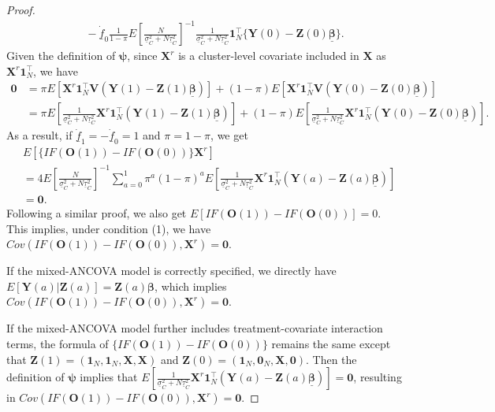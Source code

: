 \documentclass[12pt]{article}
\newcommand{\bX}{\boldsymbol{X}}
\newcommand{\bO}{\boldsymbol{O}}
\newcommand{\bZ}{\boldsymbol{Z}}
\newcommand{\bY}{\boldsymbol{Y}}
\newcommand{\bone}{\boldsymbol{1}}
\newcommand{\bzero}{\boldsymbol{0}}
\newcommand{\bbeta}{\boldsymbol{\beta}}
\newcommand{\bpsi}{\boldsymbol{\psi}}
\newcommand{\bfV}{\mathbf{V}}
\begin{document}
\begin{proof}
\begin{align*}
    &\quad - \dot{\underline{f}}_0\frac{1}{1-\pi}E\left[\frac{N}{ \underline\sigma_C^2 + N\underline\tau_C^2}\right]^{-1} \frac{1}{\underline\sigma_C^2 + N\underline\tau_C^2} \bone_N^\top \{\bY(0) - \bZ(0)\underline{\bbeta}\}.
\end{align*}
Given the definition of $\bpsi$, since $\bX^r$ is a cluster-level covariate included in $\mathbf{X}$ as $\bX^r \bone_{N}^\top$,  we have
\begin{align*}
    \bzero &= \pi E[\bX^r \bone_{N}^\top \bfV (\bY(1) - \bZ(1)\underline{\bbeta})] + (1-\pi) E[\bX^r \bone_{N}^\top \bfV (\bY(0) - \bZ(0)\underline{\bbeta})] \\
    &= \pi E\left[\frac{1}{\underline\sigma_C^2 + N\underline\tau_C^2} \bX^r \bone_N^\top (\bY(1) - \bZ(1)\underline{\bbeta}) \right] + (1-\pi) E\left[\frac{1}{\underline\sigma_C^2 + N\underline\tau_C^2} \bX^r \bone_N^\top (\bY(0) - \bZ(0)\underline{\bbeta}) \right].
\end{align*}
As a result, if $\dot{\underline{f}}_1 = - \dot{\underline{f}}_0 = 1$ and $\pi = 1-\pi$, we get 
\begin{align*}
   & E[\{IF(\bO(1)) - IF(\bO(0))\}\bX^r] \\
   &= 4E\left[\frac{N}{ \underline\sigma_C^2 + N\underline\tau_C^2}\right]^{-1} \sum_{a=0}^1 \pi^a(1-\pi)^a E\left[\frac{1}{\underline\sigma_C^2 + N\underline\tau_C^2} \bX^r \bone_N^\top (\bY(a) - \bZ(a)\underline{\bbeta}) \right] \\
   &= \bzero.
\end{align*}
Following a similar proof, we also get $E[IF(\bO(1)) - IF(\bO(0))] = 0$. This implies, under condition (1), we have $Cov(IF(\bO(1)) - IF(\bO(0)), \bX^r) = \bzero$. 

If the mixed-ANCOVA model is correctly specified, we directly have $E[\bY(a)|\bZ(a)] = \bZ(a)\bbeta$, which implies $Cov(IF(\bO(1)) - IF(\bO(0)), \bX^r) = \bzero$. 

If the mixed-ANCOVA model further includes treatment-covariate interaction terms, the formula of $\{IF(\bO(1)) - IF(\bO(0))\}$ remains the same except that $\bZ(1) = (\bone_N, \bone_N, \mathbf{X}, \mathbf{X})$ and $\bZ(0) = (\bone_N, \bzero_N, \mathbf{X}, \bzero)$. Then the definition of $\bpsi$ implies that $E\left[\frac{1}{\underline\sigma_C^2 + N\underline\tau_C^2} \bX^r \bone_N^\top (\bY(a) - \bZ(a)\underline{\bbeta}) \right] = \bzero$, resulting in $Cov(IF(\bO(1)) - IF(\bO(0)), \bX^r) = \bzero$.
\end{proof}
\end{document}

